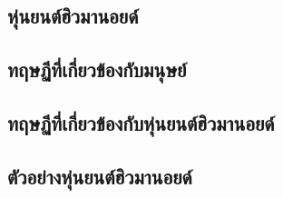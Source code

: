 \subsection{หุ่นยนต์ฮิวมานอยด์}


\clearpage
\subsection{ทฤษฏีที่เกี่ยวข้องกับมนุษย์}


\clearpage
\subsection{ทฤษฏีที่เกี่ยวข้องกับหุ่นยนต์ฮิวมานอยด์}


\clearpage
\subsection{ตัวอย่างหุ่นยนต์ฮิวมานอยด์}




